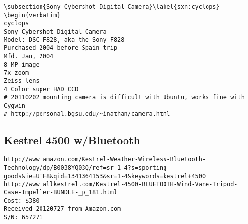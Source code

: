 \documentclass[12pt,twoside]{article}
\begin{document}
\begin{verbatim}
\subsection{Sony Cybershot Digital Camera}\label{sxn:cyclops}
\begin{verbatim}
cyclops
Sony Cybershot Digital Camera
Model: DSC-F828, aka the Sony F828
Purchased 2004 before Spain trip
Mfd. Jan, 2004
8 MP image
7x zoom
Zeiss lens
4 Color super HAD CCD
# 20110202 mounting camera is difficult with Ubuntu, works fine with Cygwin
# http://personal.bgsu.edu/~inathan/camera.html

\end{verbatim}

\subsection{Kestrel 4500 w/Bluetooth}\label{sxn:kestrel}
\begin{verbatim}
http://www.amazon.com/Kestrel-Weather-Wireless-Bluetooth-Technology/dp/B0038YQ03Q/ref=sr_1_4?s=sporting-goods&ie=UTF8&qid=1341364153&sr=1-4&keywords=kestrel+4500
http://www.allkestrel.com/Kestrel-4500-BLUETOOTH-Wind-Vane-Tripod-Case-Impeller-BUNDLE-_p_181.html
Cost: $380
Received 20120727 from Amazon.com
S/N: 657271
\end{verbatim}
\end{document}
